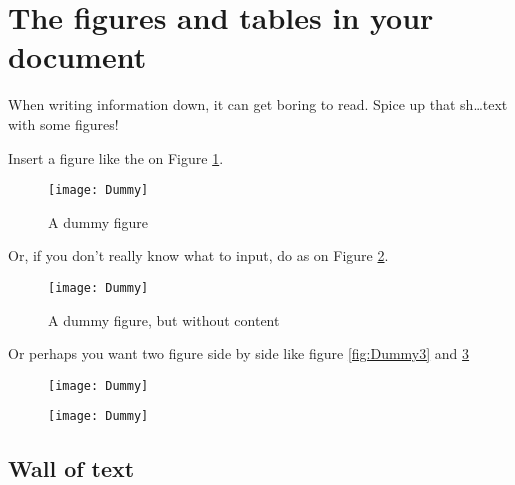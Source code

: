 
\section{The figures and tables in your document}

When writing information down, it can get boring to read.
Spice up that sh\dots text with some figures!

Insert a figure like the on Figure \ref{fig:Dummy1}.

\begin{figure}[hbtp]
\centering
\texttt{[image: Dummy]}
\caption{A dummy figure}
\label{fig:Dummy1}
\end{figure}

Or, if you don't really know what to input, do as on Figure \ref{fig:Dummy2}.

\begin{figure}[hbtp]
\centering
\texttt{[image: Dummy]}
\caption{A dummy figure, but without content}
\label{fig:Dummy2}
\end{figure}

Or perhaps you want two figure side by  side like figure \ref{fig:Dummy3} and \ref{fig:Dummy4}

\begin{figure}[hbtp]
	\centering

	\begin{minipage}[t]{.45\textwidth}
		\texttt{[image: Dummy]}
		\label{fig:Dummy3}
	\end{minipage} 
	\hfill %
	\begin{minipage}[t]{.45\textwidth}
		\texttt{[image: Dummy]}
		\label{fig:Dummy4}
	\end{minipage}

\end{figure}



\subsection{Wall of text}

\lipsum[1-5]





\newpage

